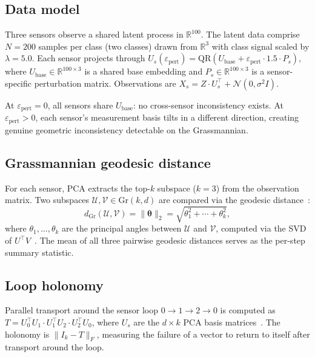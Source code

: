 \documentclass[11pt]{article}
\newcommand{\eps}{\varepsilon}
\newcommand{\epspert}{\eps_\mathrm{pert}}
\newcommand{\Gr}{\mathrm{Gr}}
\begin{document}
\subsection{Data model}

Three sensors observe a shared latent process in
$\mathbb{R}^{100}$.  The latent data comprise $N = 200$ samples
per class (two classes) drawn from $\mathbb{R}^3$ with class
signal scaled by $\lambda = 5.0$.  Each sensor projects through
$U_s(\epspert) = \mathrm{QR}(U_\mathrm{base} + \epspert \cdot 1.5
\cdot P_s)$, where $U_\mathrm{base} \in \mathbb{R}^{100 \times 3}$
is a shared base embedding and $P_s \in \mathbb{R}^{100 \times 3}$
is a sensor-specific perturbation matrix.  Observations are
$X_s = Z \cdot U_s^\top + \mathcal{N}(0, \sigma^2 I)$.

At $\epspert = 0$, all sensors share $U_\mathrm{base}$: no
cross-sensor inconsistency exists.  At $\epspert > 0$, each
sensor's measurement basis tilts in a different direction,
creating genuine geometric inconsistency detectable on the
Grassmannian.

\subsection{Grassmannian geodesic distance}

For each sensor, PCA extracts the top-$k$ subspace ($k = 3$) from
the observation matrix.  Two subspaces $\mathcal{U},
\mathcal{V} \in \Gr(k, d)$ are compared via the geodesic
distance~\citep{ye2016schubert}:
\begin{equation}
  d_{\Gr}(\mathcal{U}, \mathcal{V}) =
    \|\boldsymbol{\theta}\|_2
    = \sqrt{\theta_1^2 + \cdots + \theta_k^2},
  \label{eq:geodesic}
\end{equation}
where $\theta_1, \ldots, \theta_k$ are the principal angles between
$\mathcal{U}$ and $\mathcal{V}$, computed via the SVD of
$U^\top V$~\citep{golub1973numerical}.
The mean of all three pairwise geodesic distances serves as the
per-step summary statistic.

\subsection{Loop holonomy}

Parallel transport around the sensor loop $0 \to 1 \to 2 \to 0$
is computed as $T = U_0^\top U_1 \cdot U_1^\top U_2 \cdot
U_2^\top U_0$, where $U_s$ are the $d \times k$ PCA basis
matrices~\citep{absil2008optimization, bendokat2024grassmann}.
The holonomy is $\|I_k - T\|_F$, measuring the failure of a vector
to return to itself after transport around the loop.
\end{document}
